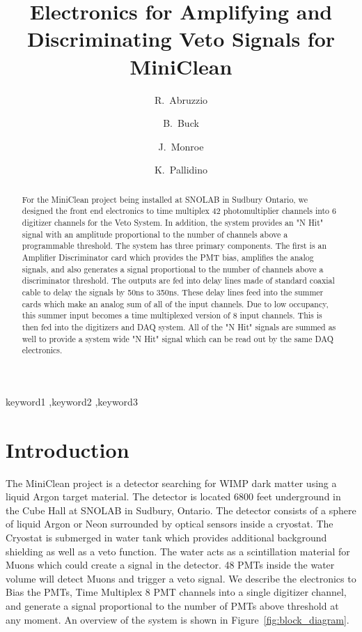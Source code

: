 \documentclass[preprint,12pt]{elsarticle}
\begin{document}
\begin{frontmatter}
\title{Electronics for Amplifying and Discriminating Veto Signals for MiniClean}
\author[mit]{R.~Abruzzio}
\author[mit]{B.~Buck}
\author[rhul]{J.~Monroe}
\author[mit]{K.~Pallidino}
\address[mit]{Massachusetts Institute of Technology, Cambridge, MA, USA}
\address[rhul]{Royal Holloway University of London, Egham, Surrey, UK}
\begin{abstract}
For the MiniClean project being installed at SNOLAB in Sudbury Ontario, we designed the front end electronics to time multiplex 42 photomultiplier channels into 6 digitizer channels for the Veto System.  In addition, the system provides an "N Hit" signal with an amplitude proportional to the number of channels above a programmable threshold.  The system has three primary components.  The first is an Amplifier Discriminator card which provides the PMT bias, amplifies the analog signals, and also generates a signal proportional to the number of channels above a discriminator threshold.  The outputs are fed into delay lines made of standard coaxial cable to delay the signals by 50ns to 350ns.  These delay lines feed into the summer cards which make an analog sum of all of the input channels.  Due to low occupancy, this summer input becomes a time multiplexed version of 8 input channels.  This is then fed into the digitizers and DAQ system.  All of the "N Hit" signals are summed as well to provide a system wide "N Hit" signal which can be read out by the same DAQ electronics.
\end{abstract}

\begin{keyword}
keyword1 \sep keyword2 \sep keyword3
\end{keyword}

\end{frontmatter}

\section{Introduction}
\label{Introduction}
The MiniClean project is a detector searching for WIMP dark matter using a liquid Argon target material.  The detector is located 6800 feet underground in the Cube Hall at SNOLAB in Sudbury, Ontario.  The detector consists of a sphere of liquid Argon or Neon surrounded by optical sensors inside a cryostat.  The Cryostat is submerged in water tank which provides additional background shielding as well as a veto function.  The water acts as a scintillation material for Muons which could create a signal in the detector.  48 PMTs inside the water volume will detect Muons and trigger a veto signal.  We describe the electronics to Bias the PMTs, Time Multiplex 8 PMT channels into a single digitizer channel, and generate a signal proportional to the number of PMTs above threshold at any moment.  An overview of the system is shown in Figure~\ref{fig:block_diagram}.
\end{document}
